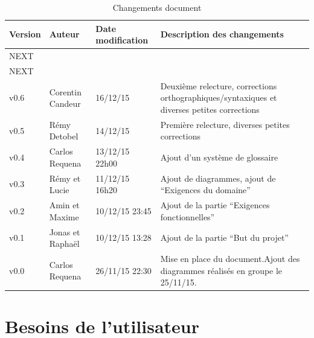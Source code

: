 \documentclass[11pt,a4paper]{article}
\begin{document}
\begin{table}[h]
  \centering
  \begin{tabular}[ht]{|l|l|l|p{18em}|}
    \hline

    \textbf{Version}
    & \textbf{Auteur}
    & \textbf{Date modification}
    & \textbf{Description des changements}\\ \hline \hline
    NEXT &  &  &  \\ \hline
    NEXT &  &  &  \\ \hline
     v0.6 & Corentin Candeur & 16/12/15 & Deuxième relecture, corrections orthographiques/syntaxiques et diverses petites corrections \\ \hline
    v0.5 & Rémy Detobel & 14/12/15 & Première relecture, diverses petites corrections \\ \hline
    v0.4 & Carlos Requena  & 13/12/15 22h00 & Ajout d'un système de glossaire \\ \hline
    v0.3 & Rémy et Lucie  & 11/12/15 16h20 & Ajout de diagrammes, ajout de ``Exigences du domaine'' \\ \hline
    v0.2 & Amin et Maxime & 10/12/15 23:45 & Ajout de la partie ``Exigences fonctionnelles''\\ \hline
    v0.1 & Jonas et Raphaël & 10/12/15 13:28 & Ajout de la partie ``But du projet''\\ \hline
    v0.0 & Carlos Requena & 26/11/15 22:30 & Mise en place du document.Ajout des diagrammes réalisés en groupe le 25/11/15.\\ \hline
  \end{tabular}
  \caption{Changements document}
  \label{tab:hist}
\end{table}


\glsaddall
\printnoidxglossaries


\section{Besoins de l'utilisateur}
\label{sec:besoins}
\end{document}
